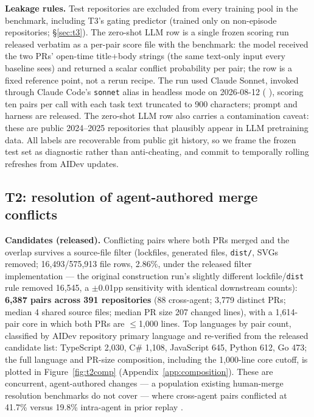 \documentclass{article}
\begin{document}
\textbf{Leakage rules.} Test repositories are excluded from every training pool in the benchmark, including T3's gating predictor (trained only on non-episode repositories; \S\ref{sec:t3}). The zero-shot LLM row is a single frozen scoring run released verbatim as a per-pair score file with the benchmark: the model received the two PRs' open-time title{+}body strings (the same text-only input every baseline sees) and returned a scalar conflict probability per pair; the row is a fixed reference point, not a rerun recipe. The run used Claude Sonnet, invoked through Claude Code's \texttt{sonnet} alias in headless mode on 2026-08-12 (%
), scoring ten pairs per call with each task text truncated to 900 characters; prompt and harness are released. %
The zero-shot LLM row also carries a contamination caveat: these are public 2024--2025 repositories that plausibly appear in LLM pretraining data. All labels are recoverable from public git history, so we frame the frozen test set as diagnostic rather than anti-cheating, and commit to temporally rolling refreshes from AIDev updates.

\subsection{T2: resolution of agent-authored merge conflicts}
\label{sec:t2}

\textbf{Candidates (released).} Conflicting pairs where both PRs merged and the overlap survives a source-file filter (lockfiles, generated files, \texttt{dist/}, SVGs removed; 16{,}493/575{,}913 file rows, 2.86\%, under the released filter implementation --- the original construction run's slightly different lockfile/\texttt{dist} rule removed 16{,}545, a $\pm$0.01pp sensitivity with identical downstream counts): \textbf{6{,}387 pairs across 391 repositories} (88 cross-agent; 3{,}779 distinct PRs; median 4 shared source files; median PR size 207 changed lines), with a 1{,}614-pair core in which both PRs are $\leq$1{,}000 lines. %
Top languages by pair count, classified by AIDev repository primary language and re-verified from the released candidate list: TypeScript 2{,}030, C\# 1{,}108, JavaScript 645, Python 612, Go 473; the full language and PR-size composition, including the 1{,}000-line core cutoff, is plotted in Figure~\ref{fig:t2comp} (Appendix~\ref{app:composition}). %
These are concurrent, agent-authored changes --- a population existing human-merge resolution benchmarks do not cover --- where cross-agent pairs conflicted at 41.7\% versus 19.8\% intra-agent in prior replay \citep{xu2026agentprs}.
\end{document}
